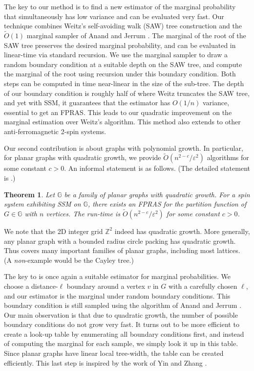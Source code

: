 \documentclass[11pt,a4paper]{amsart}
\def\=#1{\mathbb{#1}}
\newcommand{\eps}{\varepsilon}
\newtheorem{theorem}{Theorem}
\theoremstyle{definition}
\theoremstyle{remark}
\begin{document}
The key to our method is to find a new estimator of the marginal probability that simultaneously has low variance and can be evaluated very fast.
Our technique combines Weitz's self-avoiding walk (SAW) tree construction and the $\widetilde{O}(1)$ marginal sampler of Anand and Jerrum \cite{AJ22}.
The marginal of the root of the SAW tree preserves the desired marginal probability,
and can be evaluated in linear-time via standard recursion.
We use the marginal sampler to draw a random boundary condition at a suitable depth on the SAW tree, and compute the marginal of the root using recursion under this boundary condition.
Both steps can be computed in time near-linear in the size of the sub-tree.
The depth of our boundary condition is roughly half of where Weitz truncates the SAW tree,
and yet with SSM, it guarantees that the estimator has $O(1/n)$ variance, essential to get an FPRAS.
This leads to our quadratic improvement on the marginal estimation over Weitz's algorithm.
This method also extends to other anti-ferromagnetic 2-spin systems.

Our second contribution is about graphs with polynomial growth.
In particular, for planar graphs with quadratic growth,
we provide $\widetilde{O}(n^{2-c}/\eps^2)$ algorithms for some constant $c>0$.
An informal statement is as follows.
(The detailed statement is .)

\begin{theorem}\label{thm:main2}
  Let $\=G$ be a family of planar graphs with quadratic growth.
  For a spin system exhibiting SSM on $\=G$,
  there exists an FPRAS for the partition function of $G\in\=G$ with $n$ vertices.
  The run-time is $\widetilde{O}(n^{2-c}/\eps^2)$ for some constant $c>0$.
\end{theorem}

We note that the 2D integer grid $\=Z^2$ indeed has quadratic growth.
More generally, any planar graph with a bounded radius circle packing has quadratic growth.
Thus  covers many important families of planar graphs, including most lattices.
(A \emph{non}-example would be the Cayley tree.)

The key to  is once again a suitable estimator for marginal probabilities.
We choose a distance-$\ell$ boundary around a vertex $v$ in $G$ with a carefully chosen $\ell$,
and our estimator is the marginal under random boundary conditions.
This boundary condition is still sampled using the algorithm of Anand and Jerrum \cite{AJ22}.
Our main observation is that due to quadratic growth, 
the number of possible boundary conditions do not grow very fast.
It turns out to be more efficient to create a look-up table by enumerating all boundary conditions first,
and instead of computing the marginal for each sample,
we simply look it up in this table.
Since planar graphs have linear local tree-width,
the table can be created efficiently.
This last step is inspired by the work of Yin and Zhang \cite{YZ13}.
\end{document}
